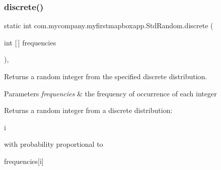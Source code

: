 \subsubsection{\texorpdfstring{discrete()}{discrete()}\hspace{0.1cm}{\footnotesize\ttfamily [2/2]}}
{\footnotesize\ttfamily static int com.\+mycompany.\+myfirstmapboxapp.\+Std\+Random.\+discrete (\begin{DoxyParamCaption}\item[{int \mbox{[}$\,$\mbox{]}}]{frequencies }\end{DoxyParamCaption})\hspace{0.3cm}{\ttfamily [inline]}, {\ttfamily [static]}}

Returns a random integer from the specified discrete distribution.


\begin{DoxyParams}{Parameters}
{\em frequencies} & the frequency of occurrence of each integer \\
\hline
\end{DoxyParams}
\begin{DoxyReturn}{Returns}
a random integer from a discrete distribution\+: 
\begin{DoxyCode}
i 
\end{DoxyCode}
 with probability proportional to
\begin{DoxyCode}
frequencies[i] 
\end{DoxyCode}
 
\end{DoxyReturn}

